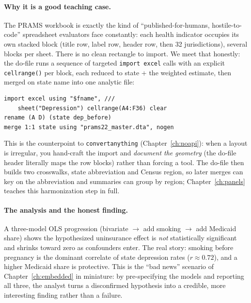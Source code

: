 \documentclass[
    a4paper,
    fontsize=10pt,
    twoside=true,
    numbers=noenddot,
]{kaobook}
\begin{document}
\paragraph{Why it is a good teaching case.} The PRAMS workbook is exactly the kind of \enquote{published-for-humans, hostile-to-code} spreadsheet evaluators face constantly: each health indicator occupies its own stacked block (title row, label row, header row, then 32 jurisdictions), several blocks per sheet. There is no clean rectangle to import. We meet that honestly: the do-file runs a sequence of targeted \texttt{import excel} calls with an explicit \texttt{cellrange()} per block, each reduced to state $+$ the weighted estimate, then merged on state name into one analytic file:
\par
{\footnotesize
\begin{verbatim}
import excel using "$fname", ///
    sheet("Depression") cellrange(A4:F36) clear
rename (A D) (state dep_before)
merge 1:1 state using "prams22_master.dta", nogen
\end{verbatim}
}
This is the counterpoint to \texttt{convertanything} (Chapter~\ref{ch:noapi}): when a layout is irregular, you hand-craft the import and \emph{document the geometry} (the do-file header literally maps the row blocks) rather than forcing a tool. The do-file then builds two crosswalks, state abbreviation and Census region, so later merges can key on the abbreviation and summaries can group by region; Chapter~\ref{ch:panels} teaches this harmonization step in full.

\paragraph{The analysis and the honest finding.} A three-model OLS progression (bivariate $\rightarrow$ add smoking $\rightarrow$ add Medicaid share) shows the hypothesized uninsurance effect is \emph{not} statistically significant and shrinks toward zero as confounders enter. The real story: smoking before pregnancy is the dominant correlate of state depression rates ($r \approx 0.72$), and a higher Medicaid share is protective. This is the \enquote{bad news} scenario of Chapter~\ref{ch:embedded} in miniature: by pre-specifying the models and reporting all three, the analyst turns a disconfirmed hypothesis into a credible, more interesting finding rather than a failure.
\end{document}
